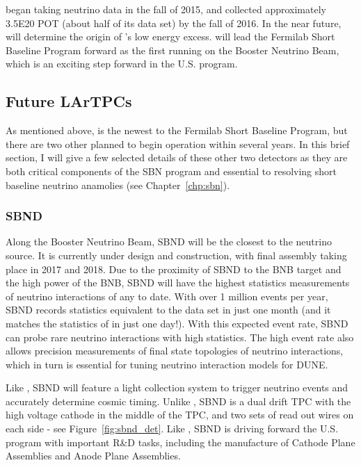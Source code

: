 \uboone began taking neutrino data in the fall of 2015, and collected approximately 3.5E20 POT (about half of its data set) by the fall of 2016.  In the near future, \uboone will determine the origin of \MB's low energy excess.  \uboone will lead the Fermilab Short Baseline Program forward as the first running \lartpc on the Booster Neutrino Beam, which is an exciting step forward in the U.S. \lartpc program.

\FloatBarrier

\subsection{\label{sec:future_tpcs} Future LArTPCs}

As mentioned above, \uboone is the newest \lartpc to the Fermilab Short Baseline Program, but there are two other \lartpcs planned to begin operation within several years.  In this brief section, I will give a few selected details of these other two detectors as they are both critical components of the SBN program and essential to resolving short baseline neutrino anamolies (see Chapter~\ref{chp:sbn}).

\subsubsection{\label{subsec:sbnd} SBND}

Along the Booster Neutrino Beam, SBND will be the \lartpc closest to the neutrino source.  It is currently under design and construction, with final assembly taking place in 2017 and 2018.  Due to the proximity of SBND to the BNB target and the high power of the BNB, SBND will have the highest statistics measurements of neutrino interactions of any \lartpc to date.  With over 1 million events per year, SBND records statistics equivalent to the \uboone data set in just one month (and it matches the statistics of \argoneut in just one day!).  With this expected event rate, SBND can probe rare neutrino interactions with high statistics.  The high event rate also allows precision measurements of final state topologies of neutrino interactions, which in turn is essential for tuning neutrino interaction models for DUNE.

Like \uboone, SBND will feature a light collection system to trigger neutrino events and accurately determine cosmic timing.  Unlike \uboone, SBND is a dual drift TPC with the high voltage cathode in the middle of the TPC, and two sets of read out wires on each side - see Figure~\ref{fig:sbnd_det}.  Like \uboone, SBND is driving forward the U.S. \lartpc program with important R\&D tasks, including the manufacture of Cathode Plane Assemblies and Anode Plane Assemblies.

